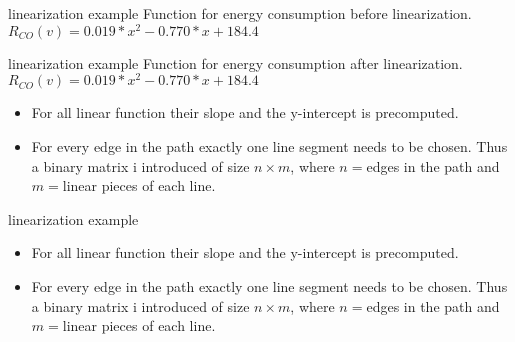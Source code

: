 \begin{frame}{linearization example}
Function for energy consumption before linearization. $R_{CO}(v)=0.019*x^2 - 0.770*x + 184.4$
\begin{figure}[!htb]
\label{fig:graph}
% 

\label{fig:graph}
\end{figure}
\end{frame}

\begin{frame}{linearization example}
Function for energy consumption after linearization. $R_{CO}(v)=0.019*x^2 - 0.770*x + 184.4$
\begin{figure}[!htb]
\label{fig:graph}
% 

\label{fig:graph}
\end{figure}
\begin{itemize}
\item For all linear function their slope and the y-intercept is precomputed. 
\item For every edge in the path exactly one line segment needs to be chosen. Thus a binary matrix i introduced of size $n \times m$, where $n=$edges in the path and $m=$linear pieces of each line. 
\end{itemize}
\end{frame}
\begin{frame}{linearization example}
\begin{itemize}
\item For all linear function their slope and the y-intercept is precomputed. 
\item For every edge in the path exactly one line segment needs to be chosen. Thus a binary matrix i introduced of size $n \times m$, where $n=$edges in the path and $m=$linear pieces of each line. 
\end{itemize}
\end{frame}



